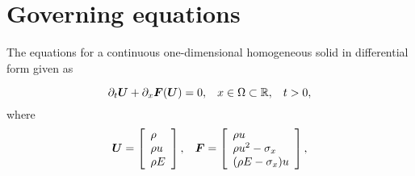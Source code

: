 \documentclass{article}
\theoremstyle{plain}\newtheorem{definition}{\sc{Definition}}
\theoremstyle{defination}\newtheorem{example}{Example}[section]
\numberwithin{equation}{section}
\numberwithin{table}{section}
\begin{document}
%
%
%
%

\section{Governing equations} 

The equations for a continuous one-dimensional homogeneous solid in differential form given as

\begin{equation}
  \partial_t \bm{U} +\partial _x \bm{F}(\bm{U}) = 0, \hspace{0.3cm} x\in \Omega \subset \mathbb{R}, \hspace{0.3cm} t>0,
\end{equation}
where
\begin{equation}
  \bm{U} = \left[ \begin{array}{l}
	  \rho \\
	  \rho u \\
	  \rho  E \\
	\end{array}
  \right],
  \hspace{0.3cm} 
  \bm{F} = \left[ \begin{array}{l}
	  \rho u \\
	  \rho u^2 -\sigma_x\\
	  (\rho E -\sigma_x)u\\
  \end{array} \right],
\end{equation}
\end{document}
